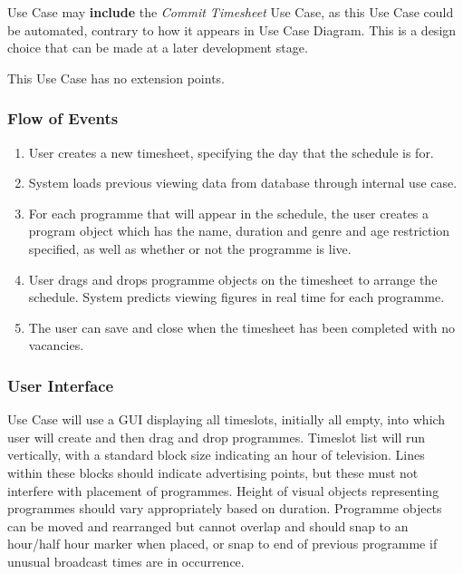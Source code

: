 \documentclass[11pt, oneside]{article}
\begin{document}
Use Case may \textbf{include} the \textit{Commit Timesheet} Use Case, as this Use Case could be automated, contrary to how it appears in Use Case Diagram. This is a design choice that can be made at a later development stage.

This Use Case has no extension points.
\subsubsection*{Flow of Events}
\begin{enumerate}
\item User creates a new timesheet, specifying the day that the schedule is for.
\item System loads previous viewing data from database through internal use case.
\item For each programme that will appear in the schedule, the user creates a program object which has the name, duration and genre and age restriction specified, as well as whether or not the programme is live. 
\item User drags and drops programme objects on the timesheet to arrange the schedule. System predicts viewing figures in real time for each programme.
\item The user can save and close when the timesheet has been completed with no vacancies.
\end{enumerate}
\subsubsection*{User Interface}
Use Case will use a GUI displaying all timeslots, initially all empty, into which user will create and then drag and drop programmes. Timeslot list will run vertically, with a standard block size indicating an hour of television. Lines within these blocks should indicate advertising points, but these must not interfere with placement of programmes. Height of visual objects representing programmes should vary appropriately based on duration. Programme objects can be moved and rearranged but cannot overlap and should snap to an hour/half hour marker when placed, or snap to end of previous programme if unusual broadcast times are in occurrence.
\end{document}
